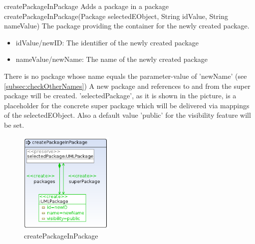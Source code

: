\op
{createPackageInPackage}
{Adds a package in a package}
{createPackageInPackage(Package selectedEObject, String idValue, String nameValue)}
{The package providing the container for the newly created package.}
{
\begin{itemize}
 \item idValue/newID: The identifier of the newly created package 
 \item nameValue/newName: The name of the newly created package
\end{itemize}
}
{There is no package whose name equals the parameter-value of 'newName' (see
\ref{subsec:checkOtherNames})}
{A new package and references to and from
the super package will be created. 'selectedPackage', as it is shown in the
picture, is a placeholder for the concrete super package which will be delivered
via mappings of the selectedEObject. Also a default value 'public' for the visibility feature
will be set.}
\begin{figure}[H]
  \centering
  \includegraphics[width=0.4\textwidth]{pics/createPackageInPackage.png}
  \caption{createPackageInPackage}
  \label{createPackageInPackage}
\end{figure}

